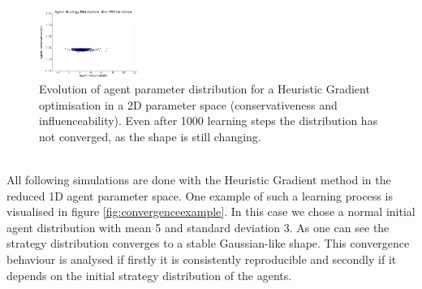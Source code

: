 \documentclass[11pt]{article}
\begin{document}
\begin{figure}
  \includegraphics[width=0.31\textwidth]{figures/2dsim_6.png}
  \caption[2D simulation]{Evolution of agent parameter distribution for a Heuristic Gradient optimisation in a 2D parameter space (conservativeness and influenceability). Even after 1000 learning steps the distribution has not converged, as the shape is still changing.}
  \label{fig:2dsimulation}
\end{figure}

\hfill \\
All following simulations are done with the Heuristic Gradient method in the reduced 1D agent parameter space. One example of such a learning process is visualised in figure \ref{fig:convergenceexample}. In this case we chose a normal initial agent distribution with mean 5 and standard deviation 3. As one can see the strategy distribution converges to a stable Gaussian-like shape. This convergence behaviour is analysed if firstly it is consistently reproducible and secondly if it depends on the initial strategy distribution of the agents. \\
\end{document}
